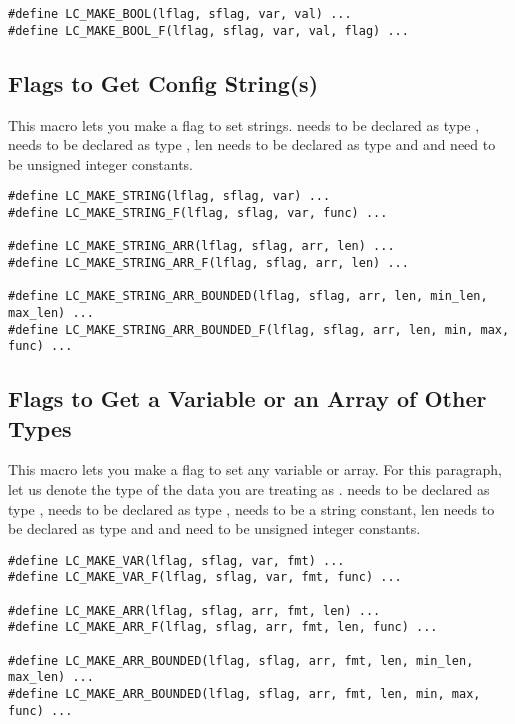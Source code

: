 \begin{verbatim}
#define LC_MAKE_BOOL(lflag, sflag, var, val) ...
#define LC_MAKE_BOOL_F(lflag, sflag, var, val, flag) ...
\end{verbatim}

\subsection{Flags to Get Config String(s)}
This macro lets you make a flag to set strings.  needs to be declared as type ,  needs to be declared as type , len needs to be declared as type  and  and  need to be unsigned integer constants.

\begin{verbatim}
#define LC_MAKE_STRING(lflag, sflag, var) ...
#define LC_MAKE_STRING_F(lflag, sflag, var, func) ...

#define LC_MAKE_STRING_ARR(lflag, sflag, arr, len) ...
#define LC_MAKE_STRING_ARR_F(lflag, sflag, arr, len) ...

#define LC_MAKE_STRING_ARR_BOUNDED(lflag, sflag, arr, len, min_len, max_len) ...
#define LC_MAKE_STRING_ARR_BOUNDED_F(lflag, sflag, arr, len, min, max, func) ...
\end{verbatim}

\subsection{Flags to Get a Variable or an Array of Other Types}
This macro lets you make a flag to set any variable or array. For this paragraph, let us denote the type of the data you are treating as .  needs to be declared as type ,  needs to be declared as type ,  needs to be a string constant, len needs to be declared as type  and  and  need to be unsigned integer constants.

\begin{verbatim}
#define LC_MAKE_VAR(lflag, sflag, var, fmt) ...
#define LC_MAKE_VAR_F(lflag, sflag, var, fmt, func) ...

#define LC_MAKE_ARR(lflag, sflag, arr, fmt, len) ...
#define LC_MAKE_ARR_F(lflag, sflag, arr, fmt, len, func) ...

#define LC_MAKE_ARR_BOUNDED(lflag, sflag, arr, fmt, len, min_len, max_len) ...
#define LC_MAKE_ARR_BOUNDED(lflag, sflag, arr, fmt, len, min, max, func) ...
\end{verbatim}
